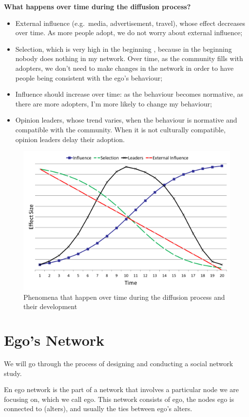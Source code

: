 \documentclass[
  notitlepage,
  onecolumn,
  openany]{book}
\providecommand{\tightlist}{%
  \setlength{\itemsep}{0pt}\setlength{\parskip}{0pt}}
\begin{document}
\textbf{What happens over time during the diffusion process?}

\begin{itemize}
\tightlist
\item
  External influence (e.g.~media, advertisement, travel), whose effect decreases over time. As more people adopt, we do not worry about external influence;
\item
  Selection, which is very high in the beginning , because in the beginning nobody does nothing in my network. Over time, as the community fills with adopters, we don't need to make changes in the network in order to have people being consistent with the ego's behaviour;
\item
  Influence should increase over time: as the behaviour becomes normative, as there are more adopters, I'm more likely to change my behaviour;
\item
  Opinion leaders, whose trend varies, when the behaviour is normative and compatible with the community. When it is not culturally compatible, opinion leaders delay their adoption.
\end{itemize}

\begin{figure}[h!]

{\centering \includegraphics[width=0.5\linewidth]{images/14-Christakis and Valente/Untitled 6} 

}

\caption{Phenomena that happen over time during the diffusion process and their development}\label{fig:unnamed-chunk-112}
\end{figure}

\hypertarget{egos-network}{%
\chapter{Ego's Network}\label{egos-network}}

We will go through the process of designing and conducting a social network study.

En ego network is the part of a network that involves a particular node we are focusing on, which we call ego. This network consists of ego, the nodes ego is connected to (alters), and usually the ties between ego's alters.
\end{document}
